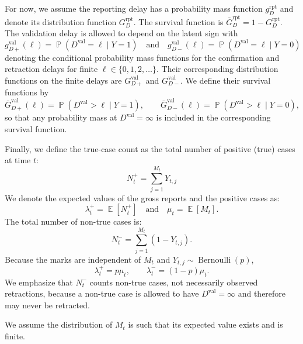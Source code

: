 \documentclass{article}
\theoremstyle{definition}
\theoremstyle{remark}
\newcommand{\E}{\operatorname{\mathbb{E}}}
\newcommand{\Prb}{\operatorname{\mathbb{P}}}
\begin{document}
For now, we assume the reporting delay has a probability mass function $g_D^{\text{rpt}}$ and denote its distribution function $G_D^{\text{rpt}}$. The survival function is $\bar{G}_D^{\text{rpt}} = 1 - G_D^{\text{rpt}}$. The validation delay is allowed to depend on the latent sign with
\begin{equation}
    g_{D+}^{\text{val}}(\ell) = \Prb(D^{\text{val}} = \ell \mid Y = 1) 
    \quad \text{and} \quad 
    g_{D-}^{\text{val}}(\ell) = \Prb(D^{\text{val}} = \ell \mid Y = 0)
\end{equation}
denoting the conditional probability mass functions for the confirmation and retraction delays for finite $\ell \in \{0,1,2,\dots\}$. Their corresponding distribution functions on the finite delays are $G_{D+}^{\text{val}}$ and $G_{D-}^{\text{val}}$. We define their survival functions by
\begin{equation}
    \bar G_{D+}^{\text{val}}(\ell)
    = \Prb(D^{\text{val}} > \ell \mid Y=1),
    \qquad
    \bar G_{D-}^{\text{val}}(\ell)
    = \Prb(D^{\text{val}} > \ell \mid Y=0),
\end{equation}
so that any probability mass at $D^{\text{val}}=\infty$ is included in the corresponding survival function.

Finally, we define the true-case count as the total number of positive (true) cases at time $t$:
\begin{equation}
    N_t^{+} = \sum\limits_{j = 1}^{M_t} Y_{t,j}
\end{equation}
We denote the expected values of the gross reports and the positive cases as:
\begin{equation}
    \lambda_t^{+} = \E[N_t^{+}] \quad \text{and} \quad  \mu_t = \E[M_t].
\end{equation}
The total number of non-true cases is:
\begin{equation}
    N_t^{-} =  \sum\limits_{j = 1}^{M_t} (1 - Y_{t,j}).
\end{equation}
Because the marks are independent of $M_t$ and $Y_{t,j}\sim\operatorname{Bernoulli}(p)$,
\begin{equation}
    \lambda_t^{+}=p\mu_t,
    \qquad
    \lambda_t^{-}=(1-p)\mu_t.
\end{equation}
We emphasize that $N_t^{-}$ counts non-true cases, not necessarily observed retractions, because a non-true case is allowed to have $D^{\mathrm{val}}=\infty$ and therefore may never be retracted.

We assume the distribution of $M_t$ is such that its expected value exists and is finite. 
\end{document}
